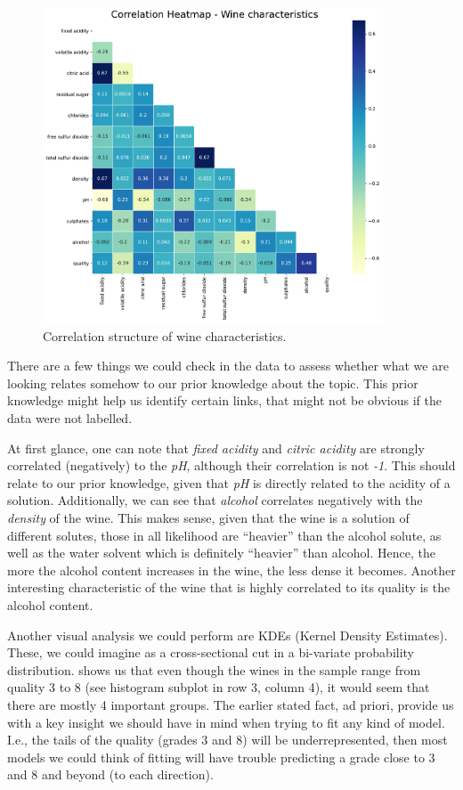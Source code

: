 \documentclass[11pt]{article}
\begin{document}
\begin{figure}[h!]
    \includegraphics[width=0.9\textwidth]{figs/wine_heatmap}
    \caption{Correlation structure of wine characteristics.}
    \label{fig:wine_heatmap}
\end{figure}


There are a few things we could check in the data to assess whether what we are looking relates somehow
to our prior knowledge about the topic.
This prior knowledge might help us identify certain links, that might not be obvious if the data were not labelled.

At first glance, one can note that \emph{fixed acidity} and \emph{citric acidity} are strongly correlated (negatively) to the \emph{pH},
although their correlation is not \emph{-1}.
This should relate to our prior knowledge, given that \emph{pH} is directly related to the acidity of a
solution.
Additionally, we can see that \emph{alcohol} correlates negatively with the \emph{density} of the wine.
This makes sense, given that the wine is a solution of different solutes, those in all likelihood are ``heavier''
than the alcohol solute, as well as the water solvent which is definitely ``heavier'' than alcohol.
Hence, the more the alcohol content increases in the wine, the less dense it becomes.
Another interesting characteristic of the wine that is highly correlated to its quality is the
alcohol content.

\vspace{2pt}
Another visual analysis we could perform are KDEs (Kernel Density Estimates).
These, we could imagine as a cross-sectional cut in a bi-variate probability distribution.
 shows us that even though the wines in the sample range from quality 3 to 8
(see histogram subplot in row 3, column 4), it would seem that there are mostly 4 important groups.
The earlier stated fact, ad priori, provide us with a key insight we should have in mind when trying
to fit any kind of model.
I.e., the tails of the quality (grades 3 and 8) will be underrepresented, then most models we could think
of fitting will have trouble predicting a grade close to 3 and 8 and beyond (to each direction).
\end{document}
